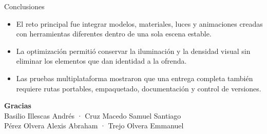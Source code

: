 \documentclass[aspectratio=169,12pt]{beamer}
\begin{document}
\begin{frame}{Conclusiones}
  \begin{itemize}
    \item El reto principal fue integrar modelos, materiales, luces y animaciones creadas con herramientas diferentes dentro de una sola escena estable.
    \item La optimización permitió conservar la iluminación y la densidad visual sin eliminar los elementos que dan identidad a la ofrenda.
    \item Las pruebas multiplataforma mostraron que una entrega completa también requiere rutas portables, empaquetado, documentación y control de versiones.
  \end{itemize}
  \vfill
  \begin{center}
    {\Large\color{cempasuchil}\textbf{Gracias}}\\[0.35cm]
    \small Basilio Illescas Andrés · Cruz Macedo Samuel Santiago\\
    Pérez Olvera Alexis Abraham · Trejo Olvera Emmanuel
  \end{center}
\end{frame}
\end{document}
